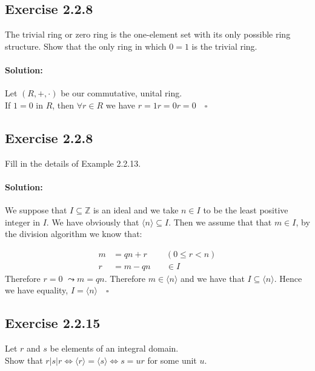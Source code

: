\documentclass{article}
\begin{document}
\subsection*{Exercise 2.2.8}
The trivial ring or zero ring is the one-element set
with its only possible ring structure. Show that the only ring in which
$0 = 1$ is the trivial ring.

\paragraph{Solution:} Let $(R, +, \cdot)$ be our commutative, unital ring.\\
If $1=0$ in $R$, then $\forall r \in R$ we have $r= 1r = 0r = 0\quad \square$

\subsection*{Exercise 2.2.8}
Fill in the details of Example 2.2.13.

\paragraph{Solution:} We suppose that $I \subseteq \mathbb{Z}$ is an ideal and we take $n \in I$ to 
be the least positive integer in $I$. We have obviously that $\langle n \rangle \subseteq I$. Then we assume that
that $m \in I$, by the division algorithm we know that:

    \begin{equation*}
        \begin{aligned}
            m &= qn +r  \quad &(0 \leq r < n)\\
            r &= m - qn \quad &\in I
        \end{aligned}
    \end{equation*}
Therefore $r=0$ $\leadsto m = qn$. Therefore $m \in \langle n \rangle$ and we have that $I \subseteq \langle n \rangle$.
Hence we have equality, $I = \langle n \rangle \quad \square$


\subsection*{Exercise 2.2.15}
Let $r$ and $s$ be elements of an integral domain.\\
Show that $r | s |r \Longleftrightarrow \langle r \rangle = \langle s \rangle \Longleftrightarrow s = ur$ for some unit $u$.
\end{document}
